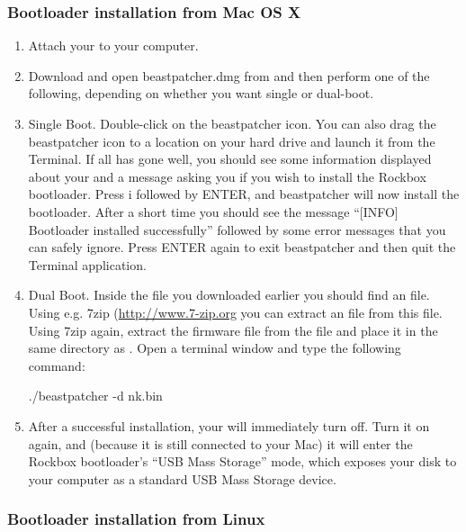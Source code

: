 \subsubsection{Bootloader installation from Mac OS X}
\begin{enumerate}
\item Attach your \dap{} to your computer.

\item Download and open beastpatcher.dmg from 
and then perform one of the following,
depending on whether you want single or dual-boot.

\item Single Boot. Double-click on the beastpatcher icon. You can also
drag the beastpatcher icon to a location on your hard drive and launch
it from the Terminal. If all has gone well, you should see some 
information displayed about your \dap{} and a message asking you if you 
wish to install the Rockbox bootloader. Press i followed by ENTER, and 
beastpatcher will now install the bootloader. After a short time you 
should see the message ``[INFO] Bootloader installed successfully''
followed by some error messages that you can safely ignore. Press 
ENTER again to exit beastpatcher and then quit the Terminal application.

\item Dual Boot. Inside the  file you downloaded earlier
you should find an  file.  Using e.g. 7zip
(\url{http://www.7-zip.org} you can extract an  file from this
 file.  Using 7zip again, extract the \playerman{} firmware file
 from the  file and place it in the same
directory as .  Open a terminal window and type the
following command:

\begin{code} 
    ./beastpatcher -d nk.bin
\end{code}

\item After a successful installation, your \dap{} will immediately turn off.
Turn it on again, and (because it is still connected to your Mac)
it will enter the Rockbox bootloader's
``USB Mass Storage'' mode, which exposes your \daps{} disk to your computer
as a standard USB Mass Storage device.
\end{enumerate}

\subsubsection{Bootloader installation from Linux}

